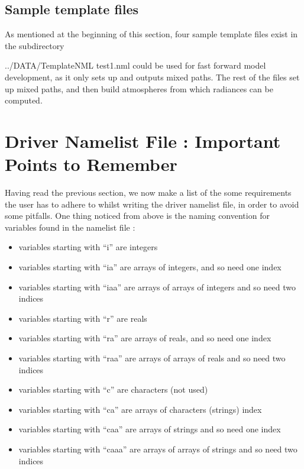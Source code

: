 \documentclass[12pt]{article}
\begin{document}
{{\subsection{Sample template files}

As mentioned at the beginning of this section, four sample template files 
exist in the subdirectory {\sf ../DATA/TemplateNML
test1.nml could be used for fast forward model development, as it only sets 
up and outputs mixed paths.  The rest of the files set up mixed paths, and 
then build atmospheres from which radiances can be computed.

\section{Driver Namelist File : Important Points to Remember}

Having read the previous section, we now make a list of the some requirements
the user has to adhere to whilst writing the driver namelist file, in order 
to avoid  some pitfalls. One thing noticed from above is the naming 
convention for variables found in the namelist file : 
\begin{itemize}
\item variables starting with ``i'' are integers
\item variables starting with ``ia'' are arrays of integers, and so need one
        index
\item variables starting with ``iaa'' are arrays of arrays of integers and so
        need two indices

\item variables starting with ``r'' are reals
\item variables starting with ``ra'' are arrays of reals, and so need one
        index
\item variables starting with ``raa'' are arrays of arrays of reals and so
        need two indices

\item variables starting with ``c'' are characters (not used)
\item variables starting with ``ca'' are arrays of characters (strings)
        index
\item variables starting with ``caa'' are arrays of strings and so need one 
      index
\item variables starting with ``caaa'' are arrays of arrays of strings and so 
      need two indices
\end{itemize}

}}}
\end{document}

